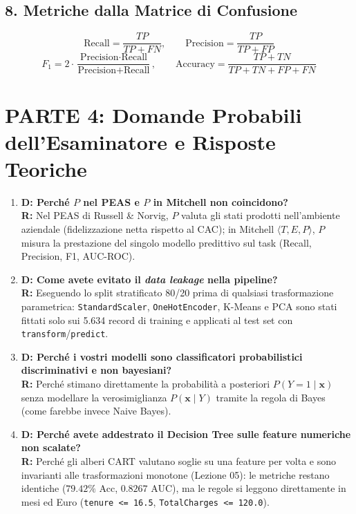 \documentclass[11pt, a4paper]{article}
\begin{document}
\subsection*{8. Metriche dalla Matrice di Confusione}
\[
\text{Recall} = \frac{TP}{TP + FN}, \qquad \text{Precision} = \frac{TP}{TP + FP}
\]
\[
F_1 = 2 \cdot \frac{\text{Precision} \cdot \text{Recall}}{\text{Precision} + \text{Recall}}, \qquad \text{Accuracy} = \frac{TP + TN}{TP + TN + FP + FN}
\]

\newpage

\section*{PARTE 4: Domande Probabili dell'Esaminatore e Risposte Teoriche}

\begin{enumerate}
    \item \textbf{D: Perché $P$ nel PEAS e $P$ in Mitchell non coincidono?}\\
    \textbf{R:} Nel PEAS di Russell \& Norvig, $P$ valuta gli stati prodotti nell'ambiente aziendale (fidelizzazione netta rispetto al CAC); in Mitchell $\langle T, E, P \rangle$, $P$ misura la prestazione del singolo modello predittivo sul task (Recall, Precision, F1, AUC-ROC).

    \item \textbf{D: Come avete evitato il \textit{data leakage} nella pipeline?}\\
    \textbf{R:} Eseguendo lo split stratificato 80/20 prima di qualsiasi trasformazione parametrica: \texttt{StandardScaler}, \texttt{OneHotEncoder}, K-Means e PCA sono stati fittati solo sui 5.634 record di training e applicati al test set con \texttt{transform}/\texttt{predict}.

    \item \textbf{D: Perché i vostri modelli sono classificatori probabilistici discriminativi e non bayesiani?}\\
    \textbf{R:} Perché stimano direttamente la probabilità a posteriori $P(Y=1 \mid \mathbf{x})$ senza modellare la verosimiglianza $P(\mathbf{x} \mid Y)$ tramite la regola di Bayes (come farebbe invece Naive Bayes).

    \item \textbf{D: Perché avete addestrato il Decision Tree sulle feature numeriche non scalate?}\\
    \textbf{R:} Perché gli alberi CART valutano soglie su una feature per volta e sono invarianti alle trasformazioni monotone (Lezione 05): le metriche restano identiche ($79.42\%$ Acc, $0.8267$ AUC), ma le regole si leggono direttamente in mesi ed Euro (\texttt{tenure <= 16.5}, \texttt{TotalCharges <= 120.0}).


\end{enumerate}
\end{document}
